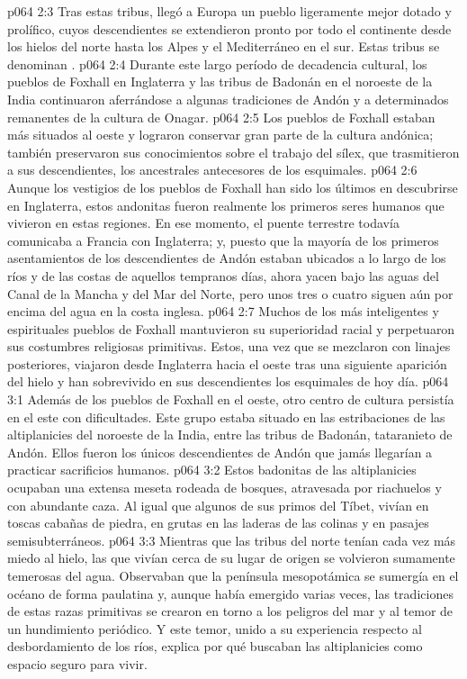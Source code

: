 \vs p064 2:3 Tras estas tribus, llegó a Europa un pueblo ligeramente mejor dotado y prolífico, cuyos descendientes se extendieron pronto por todo el continente desde los hielos del norte hasta los Alpes y el Mediterráneo en el sur. Estas tribus se denominan .
\vs p064 2:4 Durante este largo período de decadencia cultural, los pueblos de Foxhall en Inglaterra y las tribus de Badonán en el noroeste de la India continuaron aferrándose a algunas tradiciones de Andón y a determinados remanentes de la cultura de Onagar.
\vs p064 2:5 \pc Los pueblos de Foxhall estaban más situados al oeste y lograron conservar gran parte de la cultura andónica; también preservaron sus conocimientos sobre el trabajo del sílex, que trasmitieron a sus descendientes, los ancestrales antecesores de los esquimales.
\vs p064 2:6 Aunque los vestigios de los pueblos de Foxhall han sido los últimos en descubrirse en Inglaterra, estos andonitas fueron realmente los primeros seres humanos que vivieron en estas regiones. En ese momento, el puente terrestre todavía comunicaba a Francia con Inglaterra; y, puesto que la mayoría de los primeros asentamientos de los descendientes de Andón estaban ubicados a lo largo de los ríos y de las costas de aquellos tempranos días, ahora yacen bajo las aguas del Canal de la Mancha y del Mar del Norte, pero unos tres o cuatro siguen aún por encima del agua en la costa inglesa.
\vs p064 2:7 Muchos de los más inteligentes y espirituales pueblos de Foxhall mantuvieron su superioridad racial y perpetuaron sus costumbres religiosas primitivas. Estos, una vez que se mezclaron con linajes posteriores, viajaron desde Inglaterra hacia el oeste tras una siguiente aparición del hielo y han sobrevivido en sus descendientes los esquimales de hoy día.
\vs p064 3:1 Además de los pueblos de Foxhall en el oeste, otro centro de cultura persistía en el este con dificultades. Este grupo estaba situado en las estribaciones de las altiplanicies del noroeste de la India, entre las tribus de Badonán, tataranieto de Andón. Ellos fueron los únicos descendientes de Andón que jamás llegarían a practicar sacrificios humanos.
\vs p064 3:2 Estos badonitas de las altiplanicies ocupaban una extensa meseta rodeada de bosques, atravesada por riachuelos y con abundante caza. Al igual que algunos de sus primos del Tíbet, vivían en toscas cabañas de piedra, en grutas en las laderas de las colinas y en pasajes semisubterráneos.
\vs p064 3:3 Mientras que las tribus del norte tenían cada vez más miedo al hielo, las que vivían cerca de su lugar de origen se volvieron sumamente temerosas del agua. Observaban que la península mesopotámica se sumergía en el océano de forma paulatina y, aunque había emergido varias veces, las tradiciones de estas razas primitivas se crearon en torno a los peligros del mar y al temor de un hundimiento periódico. Y este temor, unido a su experiencia respecto al desbordamiento de los ríos, explica por qué buscaban las altiplanicies como espacio seguro para vivir.
